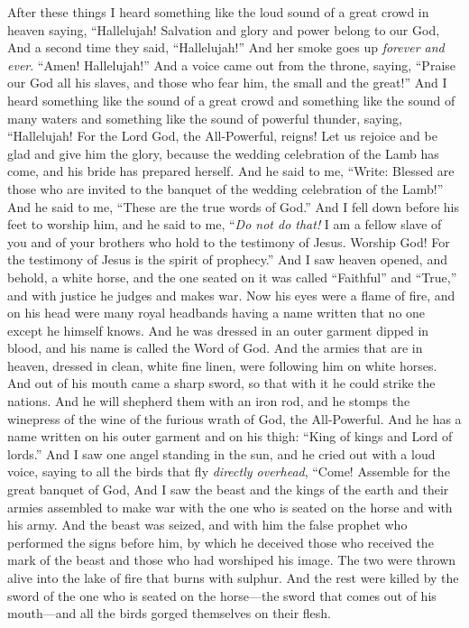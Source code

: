 \begin{biblechapter} %
 After these things I heard something like the loud sound of a great crowd in heaven saying,
\verse “Hallelujah! 
Salvation and glory and power belong to our God,
\verse And a second time they said, “Hallelujah!”
\verse And her smoke goes up \textit{forever and ever}. “Amen! Hallelujah!”
\verse And a voice came out from the throne, saying, “Praise our God 
all his slaves, 
and those who fear him, 
the small and the great!”
 And I heard something like the sound of a great crowd and something like the sound of many waters and something like the sound of powerful thunder, saying,
\verse “Hallelujah! 
For the Lord God, the All-Powerful, reigns!
\verse Let us rejoice and be glad 
and give him the glory, 
because the wedding celebration of the Lamb has come, 
and his bride has prepared herself.
\verse And he said to me, “Write: Blessed are those who are invited to the banquet of the wedding celebration of the Lamb!” And he said to me, “These are the true words of God.”
\verse And I fell down before his feet to worship him, and he said to me, “\textit{Do not do that!} I am a fellow slave of you and of your brothers who hold to the testimony of Jesus. Worship God! For the testimony of Jesus is the spirit of prophecy.”
 And I saw heaven opened, and behold, a white horse, and the one seated on it was called “Faithful” and “True,” and with justice he judges and makes war.
\verse Now his eyes were a flame of fire, and on his head were many royal headbands having a name written that no one except he himself knows.
\verse And he was dressed in an outer garment dipped in blood, and his name is called the Word of God.
\verse And the armies that are in heaven, dressed in clean, white fine linen, were following him on white horses.
\verse And out of his mouth came a sharp sword, so that with it he could strike the nations. And he will shepherd them with an iron rod, and he stomps the winepress of the wine of the furious wrath of God, the All-Powerful.
\verse And he has a name written on his outer garment and on his thigh: “King of kings and Lord of lords.”
\verse And I saw one angel standing in the sun, and he cried out with a loud voice, saying to all the birds that fly \textit{directly overhead},
\verse “Come! Assemble for the great banquet of God,
\verse And I saw the beast and the kings of the earth and their armies assembled to make war with the one who is seated on the horse and with his army.
\verse And the beast was seized, and with him the false prophet who performed the signs before him, by which he deceived those who received the mark of the beast and those who had worshiped his image. The two were thrown alive into the lake of fire that burns with sulphur.
\verse And the rest were killed by the sword of the one who is seated on the horse—the sword that comes out of his mouth—and all the birds gorged themselves on their flesh.
\end{biblechapter}

